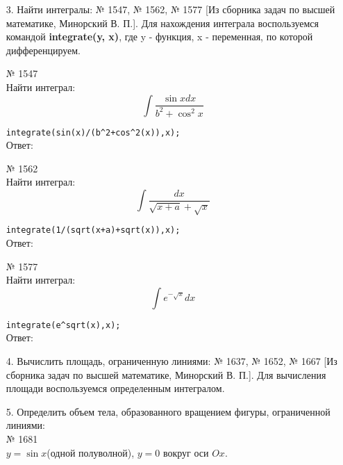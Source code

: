 \documentclass[article, bachelor, och, pract]{SCWorks}
\begin{document}
\begin{itemize}
\item[3.] Найти интегралы: № 1547, № 1562, № 1577 [Из сборника задач по высшей математике, Минорский В. П.]. Для нахождения интеграла воспользуемся командой \textbf{integrate(y, x)}, где y - функция, x - переменная, по которой дифференцируем.

№ 1547\\
Найти интеграл:
$$\int\frac{\sin{x}dx}{b^2+\cos^2{x}}$$

\texttt{integrate(sin(x)/(b\^{}2+cos\^{}2(x)),x);}\\

Ответ: 


№ 1562\\
Найти интеграл:
$$\int\frac{dx}{\sqrt{x+a}+\sqrt{x}}$$

\texttt{integrate(1/(sqrt(x+a)+sqrt(x)),x);}\\

Ответ: 


№ 1577\\
Найти интеграл:
$$\int e^{-\sqrt{x}}dx$$

\texttt{integrate(e\^{}sqrt(x),x);}\\

Ответ: 

\item[4.] Вычислить площадь, ограниченную линиями: № 1637, № 1652, № 1667 [Из сборника задач по высшей математике, Минорский В. П.]. Для вычисления площади воспользуемся определенным интегралом.


\item[5.] Определить объем тела, образованного вращением фигуры, ограниченной линиями:\\

№ 1681 \\
$y = \sin{x}$(одной полуволной), $y=0$ вокруг оси $Ox$.

\end{itemize}
\end{document}
